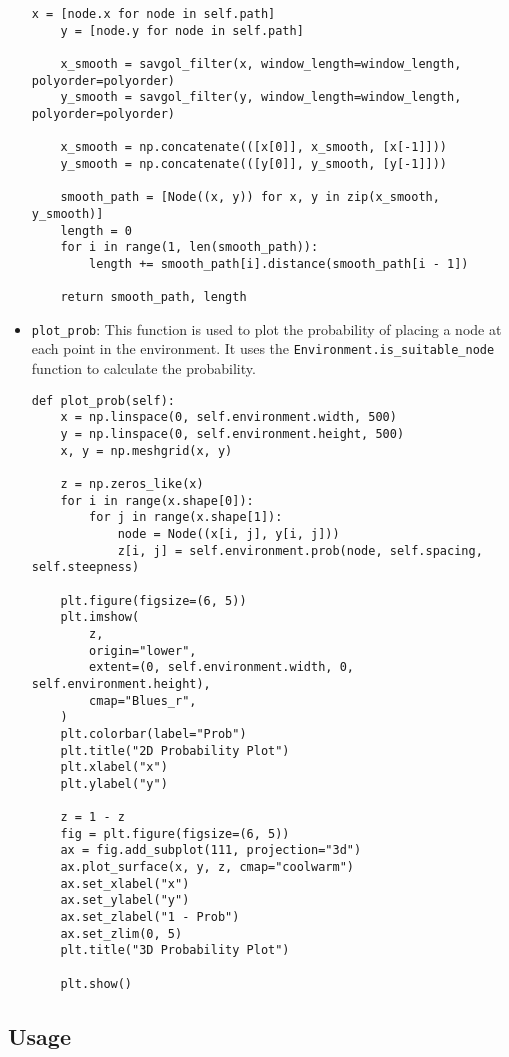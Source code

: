 \documentclass[12pt]{report}
\begin{document}
\begin{itemize}
\begin{lstlisting}[caption={\texttt{RRT.smoothen\_path}}]
    x = [node.x for node in self.path]
    y = [node.y for node in self.path]

    x_smooth = savgol_filter(x, window_length=window_length, polyorder=polyorder)
    y_smooth = savgol_filter(y, window_length=window_length, polyorder=polyorder)

    x_smooth = np.concatenate(([x[0]], x_smooth, [x[-1]]))
    y_smooth = np.concatenate(([y[0]], y_smooth, [y[-1]]))

    smooth_path = [Node((x, y)) for x, y in zip(x_smooth, y_smooth)]
    length = 0
    for i in range(1, len(smooth_path)):
        length += smooth_path[i].distance(smooth_path[i - 1])

    return smooth_path, length
            \end{lstlisting}
    \item \texttt{plot\_prob}: This function is used to plot the probability of placing a node at each point in the environment. It uses the \texttt{Environment.is\_suitable\_node} function to calculate the probability.
          \begin{lstlisting}[caption={\texttt{RRT.plot\_prob}}]
def plot_prob(self):
    x = np.linspace(0, self.environment.width, 500)
    y = np.linspace(0, self.environment.height, 500)
    x, y = np.meshgrid(x, y)

    z = np.zeros_like(x)
    for i in range(x.shape[0]):
        for j in range(x.shape[1]):
            node = Node((x[i, j], y[i, j]))
            z[i, j] = self.environment.prob(node, self.spacing, self.steepness)

    plt.figure(figsize=(6, 5))
    plt.imshow(
        z,
        origin="lower",
        extent=(0, self.environment.width, 0, self.environment.height),
        cmap="Blues_r",
    )
    plt.colorbar(label="Prob")
    plt.title("2D Probability Plot")
    plt.xlabel("x")
    plt.ylabel("y")

    z = 1 - z
    fig = plt.figure(figsize=(6, 5))
    ax = fig.add_subplot(111, projection="3d")
    ax.plot_surface(x, y, z, cmap="coolwarm")
    ax.set_xlabel("x")
    ax.set_ylabel("y")
    ax.set_zlabel("1 - Prob")
    ax.set_zlim(0, 5)
    plt.title("3D Probability Plot")

    plt.show()
            \end{lstlisting}
\end{itemize}

\subsection{Usage}
\end{document}
